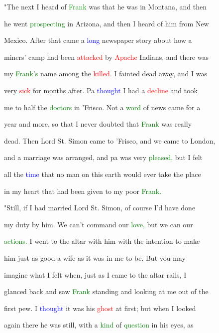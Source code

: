  "The next I heard of \textcolor{green}{Frank} was that he was in Montana, and then

 he went \textcolor{green}{prospecting} in Arizona, and then I heard of him from New

 Mexico. After that came a \textcolor{blue}{long} newspaper story about how a

 miners' camp had been \textcolor{red}{attacked} by \textcolor{red}{Apache} Indians, and there was

 my \textcolor{green}{Frank's} name among the \textcolor{red}{killed.} I fainted dead away, and I was

 very \textcolor{red}{sick} for months after. Pa \textcolor{blue}{thought} I had a \textcolor{red}{decline} and took

 me to half the \textcolor{green}{doctors} in 'Frisco. Not a \textcolor{green}{word} of news came for a

 year and more, so that I never \textcolor{BurntOrange}{doubted} that \textcolor{green}{Frank} was really

 dead. Then \textcolor{BurntOrange}{Lord} St. Simon came to 'Frisco, and we came to London,

 and a \textcolor{BurntOrange}{marriage} was arranged, and pa was very \textcolor{green}{pleased,} but I felt

 all the \textcolor{blue}{time} that no man on this earth would ever take the place

 in my heart that had been given to my poor \textcolor{green}{Frank.}



 "Still, if I had married \textcolor{BurntOrange}{Lord} St. Simon, of course I'd have done

 my duty by him. We can't command our \textcolor{green}{love,} but we can our

 \textcolor{green}{actions.} I went to the altar with him with the intention to make

 him just as \textcolor{BurntOrange}{good} a wife as it was in me to be. But you may

 imagine what I felt when, just as I came to the altar \textcolor{BurntOrange}{rails,} I

 glanced back and saw \textcolor{green}{Frank} standing and looking at me out of the

 first pew. I \textcolor{blue}{thought} it was his \textcolor{red}{ghost} at first; but when I looked

 again there he was still, with a \textcolor{green}{kind} of \textcolor{green}{question} in his eyes, as

